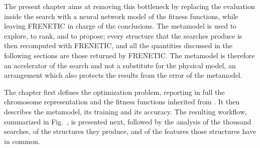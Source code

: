 The present chapter aims at removing this bottleneck by replacing the evaluation inside the
search with a neural network model of the fitness functions, while leaving
FRENETIC in charge of the conclusions. The metamodel is used to explore,
to rank, and to propose; every structure that the searches produce is then
recomputed with FRENETIC, and all the quantities discussed in the following
sections are those returned by FRENETIC. The metamodel is therefore an
accelerator of the search and not a substitute for the physical model, an arrangement
which also protects the results from the error of the metamodel.

The chapter first defines the optimization problem, reporting in full the
chromosome representation and the fitness functions inherited from
\citet{prevMulti}. It then describes the metamodel, its training and its
accuracy. The resulting workflow, summarized in Fig.~, is presented next,
followed by the analysis of the thousand searches, of the structures they
produce, and of the features those structures have in common.

